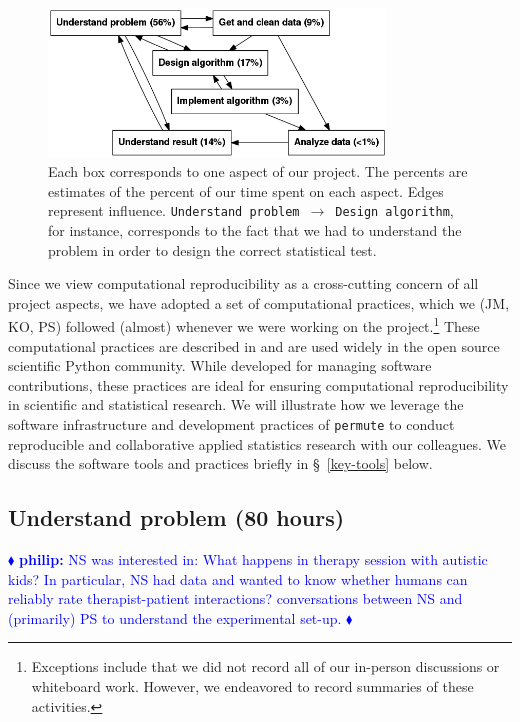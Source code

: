 \documentclass[]{article}
\newcommand{\philip}[1] { \textcolor{blue} {
\ensuremath{\blacklozenge} {\bf philip:}  {#1}
\ensuremath{\blacklozenge} } }
\begin{document}
\begin{figure}[h]
  \centering
    \includegraphics[width=0.8\textwidth]{_fig/work_process.png}
  \caption{
  \small
    Each box corresponds to one aspect of our project.
    The percents are estimates of the percent of our time spent on each aspect.
    Edges represent influence.
    \texttt{Understand problem}~$\to$~\texttt{Design algorithm}, for instance,
    corresponds to the fact that we had to understand the problem in order to
    design the correct statistical test.\label{fig:work_process}}
\end{figure}

Since we view computational reproducibility as a cross-cutting concern of all
project aspects, we have adopted a set of computational practices, which we
(JM, KO, PS) followed (almost) whenever we were working on the
project.\footnote{Exceptions include that we did not record all of our
in-person discussions or whiteboard work.  
However, we endeavored to
record summaries of these activities.}
These computational practices are described in \citet{millman2014developing}
and are used widely in the open source scientific Python community.
While developed for managing software contributions, these practices are ideal
for ensuring computational reproducibility in scientific and statistical
research.
We will illustrate how we leverage the software infrastructure and development
practices of \texttt{permute} to conduct reproducible and collaborative applied
statistics research with our colleagues.
We discuss the software tools and practices briefly in \S~\ref{key-tools} below.

\subsection{Understand problem (80 hours)}

\philip{
NS was interested in:  What happens in therapy session with autistic kids?
In particular, NS had data and wanted to know whether humans can reliably rate
therapist-patient interactions?
conversations between NS and (primarily) PS to understand the experimental
set-up.
}
\end{document}
